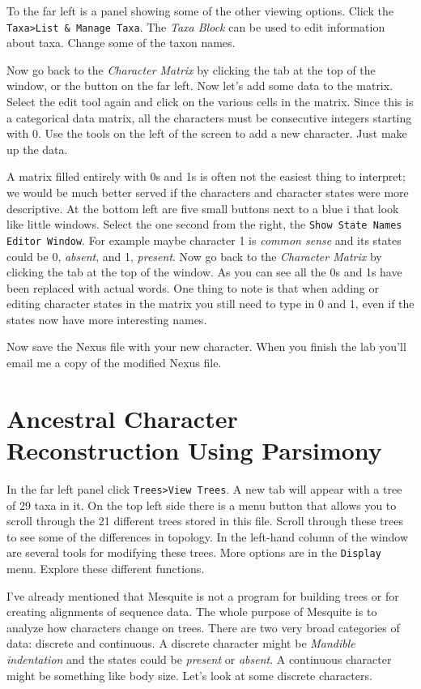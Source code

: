 \documentclass[11pt]{article}
\begin{document}
To the far left is a panel showing some of the other viewing options. 
Click the \texttt{Taxa>List \& Manage Taxa}. The \textit{Taxa Block} can be used to edit information about taxa. 
Change some of the taxon names.

Now go back to the \textit{Character Matrix} by clicking the tab at the top of the window, or the button on the far left. Now let's add some data to the matrix. Select the edit tool again and click on the various cells in the matrix. Since this is a categorical data matrix, all the characters must be consecutive integers starting with 0.
Use the tools on the left of the screen to add a new character. Just make up the data.

A matrix filled entirely with 0s and 1s is often not the easiest thing to interpret; we would be much better served if the characters and character states were more descriptive. At the bottom left are five small buttons next to a blue i that look like little windows. 
Select the one second from the right, the \texttt{Show State Names Editor Window}. 
For example maybe character 1 is \textit{common sense} and its states could be 0, \textit{absent}, and 1, \textit{present}. 
Now go back to the \textit{Character Matrix} by clicking the tab at the top of the window. 
As you can see all the 0s and 1s have been replaced with actual words. 
One thing to note is that when adding or editing character states in the matrix you still need to type in 0 and 1, even if the states now have more interesting names.

Now save the Nexus file with your new character. 
When you finish the lab you'll email me a copy of the modified Nexus file.

\section{Ancestral Character Reconstruction Using Parsimony}

In the far left panel click \texttt{Trees>View Trees}.
A new tab will appear with a tree of 29 taxa in it. On the top left side there is a menu button
that allows you to scroll through the 21 different trees stored in this file. 
Scroll through these trees to see some of the differences in topology. 
In the left-hand column of the window are several tools for modifying these trees. 
More options are in the \texttt{Display} menu.
Explore these different functions.

I’ve already mentioned that Mesquite is not a program for building trees or for creating alignments of sequence data. The whole purpose of Mesquite is to analyze how characters change on trees. 
There are two very broad categories of data: discrete and continuous. 
A discrete character might be \textit{Mandible indentation} and the states could be \textit{present} or \textit{absent}. 
A continuous character might be something like body size. Let’s look at some discrete characters.
\end{document}
